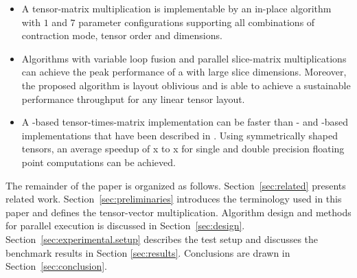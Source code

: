 \begin{itemize}
	\item 
	A tensor-matrix multiplication is implementable by an in-place algorithm with $1$  and $7$  parameter configurations supporting all combinations of contraction mode, tensor order and dimensions.
	\item 
	Algorithms with variable loop fusion and parallel slice-matrix multiplications can achieve the peak performance of a  with large slice dimensions. %
	Moreover, the proposed algorithm is layout oblivious and is able to achieve a sustainable performance throughput for any linear tensor layout.
	\item
	A -based tensor-times-matrix implementation can be faster than - and -based implementations that have been described in \cite{springer:2018:design, matthews:2018:high}.
	Using symmetrically shaped tensors, an average speedup of \tq x to \tq x for single and double precision floating point computations can be achieved.
\end{itemize}

The remainder of the paper is organized as follows. 
Section~\ref{sec:related} presents related work.
Section~\ref{sec:preliminaries} introduces the terminology used in this paper and defines the tensor-vector multiplication.
Algorithm design and methods for parallel execution is discussed in Section~\ref{sec:design}.
Section~\ref{sec:experimental.setup} describes the test setup and discusses the benchmark results in Section \ref{sec:results}.
Conclusions are drawn in Section~\ref{sec:conclusion}.


